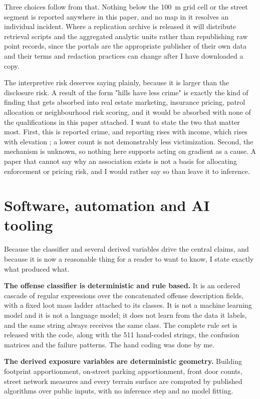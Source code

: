 \documentclass[11pt,letterpaper]{article}
\begin{document}
Three choices follow from that. Nothing below the 100~m grid cell or the street
segment is reported anywhere in this paper, and no map in it resolves an individual
incident. Where a replication archive is released it will distribute retrieval scripts
and the aggregated analytic units rather than republishing raw point records, since
the portals are the appropriate publisher of their own data and their terms and
redaction practices can change after I have downloaded a copy.

The interpretive risk deserves saying plainly, because it is larger than the
disclosure risk. A result of the form "hills have less crime" is exactly the kind of
finding that gets absorbed into real estate marketing, insurance pricing, patrol
allocation or neighbourhood risk scoring, and it would be absorbed with none of the
qualifications in this paper attached. I want to state the two that matter most.
First, this is reported crime, and reporting rises with income, which rises with
elevation \cite{yebecker2018}; a lower count is not demonstrably less victimization.
Second, the mechanism is unknown, so nothing here supports acting on gradient as a
cause. A paper that cannot say why an association exists is not a basis for allocating
enforcement or pricing risk, and I would rather say so than leave it to inference.

\section{Software, automation and AI tooling}

Because the classifier and several derived variables drive the central claims, and
because it is now a reasonable thing for a reader to want to know, I state exactly
what produced what.

\textbf{The offense classifier is deterministic and rule based.} It is an ordered
cascade of regular expressions over the concatenated offense description fields, with
a fixed loot mass ladder attached to its classes. It is not a machine learning model
and it is not a language model; it does not learn from the data it labels, and the
same string always receives the same class. The complete rule set is released with the
code, along with the 511 hand-coded strings, the confusion matrices and the failure
patterns. The hand coding was done by me.

\textbf{The derived exposure variables are deterministic geometry.} Building footprint
apportionment, on-street parking apportionment, front door counts, street network
measures and every terrain surface are computed by published algorithms over public
inputs, with no inference step and no model fitting.
\end{document}
